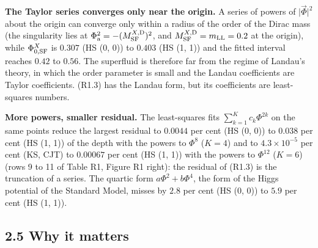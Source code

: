 \documentclass[
  10pt,
]{article}
\begin{document}
\textbf{The Taylor series converges only near the origin.} A series of
powers of \(\lvert\vec\Phi\rvert^2\) about the origin can converge only
within a radius of the order of the Dirac mass (the singularity lies at
\(\Phi_{\rm a}^2=-(M^{X,{\rm D}}_{\rm SF})^2\), and
\(M^{X,{\rm D}}_{\rm SF}=m_{\rm LL}=0.2\) at the origin), while
\(\Phi^X_{0,{\rm SF}}\) is \(0.307\) (HS (0, 0)) to \(0.403\) (HS (1,
1)) and the fitted interval reaches \(0.42\) to \(0.56\). The superfluid
is therefore far from the regime of Landau's theory, in which the order
parameter is small and the Landau coefficients are Taylor coefficients.
(R1.3) has the Landau form, but its coefficients are least-squares
numbers.

\textbf{More powers, smaller residual.} The least-squares fits
\(\sum_{k=1}^Kc_k\Phi^{2k}\) on the same points reduce the largest
residual to \(0.0044\) per cent (HS (0, 0)) to \(0.038\) per cent (HS
(1, 1)) of the depth with the powers to \(\Phi^8\) (\(K=4\)) and to
\(4.3\times10^{-5}\) per cent (KS, CJT) to \(0.00067\) per cent (HS (1,
1)) with the powers to \(\Phi^{12}\) (\(K=6\)) (rows 9 to 11 of Table
R1, Figure R1 right): the residual of (R1.3) is the truncation of a
series. The quartic form \(a\Phi^2+b\Phi^4\), the form of the Higgs
potential of the Standard Model, misses by \(2.8\) per cent (HS (0, 0))
to \(5.9\) per cent (HS (1, 1)).

\hypertarget{why-it-matters}{%
\subsection{2.5 Why it matters}\label{why-it-matters}}
\end{document}
